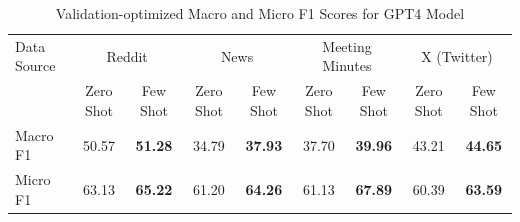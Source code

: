 \begin{table}[htbp]
\centering
\begin{tabular}{l *{8}{c}}
\toprule
Data Source & \multicolumn{2}{c}{Reddit} & \multicolumn{2}{c}{News} & \multicolumn{2}{c}{Meeting Minutes} & \multicolumn{2}{c}{X (Twitter)} \\
& Zero Shot & Few Shot & Zero Shot & Few Shot & Zero Shot & Few Shot & Zero Shot & Few Shot \\
\midrule
Macro F1 & 50.57 & \textbf{51.28} & 34.79 & \textbf{37.93} & 37.70 & \textbf{39.96} & 43.21 & \textbf{44.65} \\
Micro F1 & 63.13 & \textbf{65.22} & 61.20 & \textbf{64.26} & 61.13 & \textbf{67.89} & 60.39 & \textbf{63.59} \\
\bottomrule
\end{tabular}
\centering\caption{Validation-optimized Macro and Micro F1 Scores for GPT4 Model}
\label{tab:gpt4_macro_micro}
\end{table}